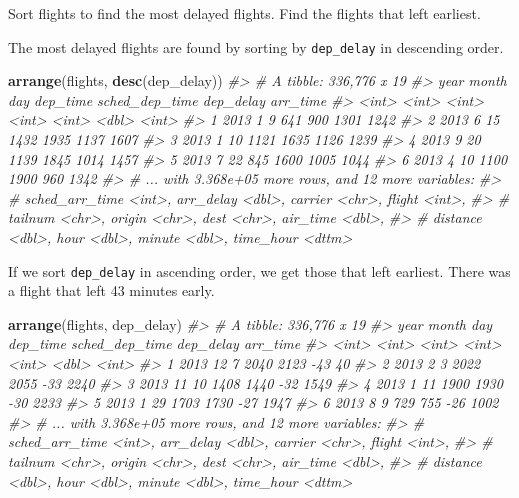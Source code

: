 \documentclass[]{book}
\newenvironment{Shaded}{\begin{snugshade}}{\end{snugshade}}
\newcommand{\CommentTok}[1]{\textcolor[rgb]{0.56,0.35,0.01}{\textit{#1}}}
\newcommand{\KeywordTok}[1]{\textcolor[rgb]{0.13,0.29,0.53}{\textbf{#1}}}
\newcommand{\NormalTok}[1]{#1}
\theoremstyle{plain}
\theoremstyle{remark}
\theoremstyle{definition}
\theoremstyle{definition}
\theoremstyle{definition}
\theoremstyle{remark}
\begin{document}
Sort flights to find the most delayed flights. Find the flights that
left earliest.

The most delayed flights are found by sorting by \texttt{dep\_delay} in
descending order.

\begin{Shaded}
\begin{Highlighting}[]
\KeywordTok{arrange}\NormalTok{(flights, }\KeywordTok{desc}\NormalTok{(dep_delay))}
\CommentTok{#> # A tibble: 336,776 x 19}
\CommentTok{#>    year month   day dep_time sched_dep_time dep_delay arr_time}
\CommentTok{#>   <int> <int> <int>    <int>          <int>     <dbl>    <int>}
\CommentTok{#> 1  2013     1     9      641            900      1301     1242}
\CommentTok{#> 2  2013     6    15     1432           1935      1137     1607}
\CommentTok{#> 3  2013     1    10     1121           1635      1126     1239}
\CommentTok{#> 4  2013     9    20     1139           1845      1014     1457}
\CommentTok{#> 5  2013     7    22      845           1600      1005     1044}
\CommentTok{#> 6  2013     4    10     1100           1900       960     1342}
\CommentTok{#> # ... with 3.368e+05 more rows, and 12 more variables:}
\CommentTok{#> #   sched_arr_time <int>, arr_delay <dbl>, carrier <chr>, flight <int>,}
\CommentTok{#> #   tailnum <chr>, origin <chr>, dest <chr>, air_time <dbl>,}
\CommentTok{#> #   distance <dbl>, hour <dbl>, minute <dbl>, time_hour <dttm>}
\end{Highlighting}
\end{Shaded}

If we sort \texttt{dep\_delay} in ascending order, we get those that
left earliest. There was a flight that left 43 minutes early.

\begin{Shaded}
\begin{Highlighting}[]
\KeywordTok{arrange}\NormalTok{(flights, dep_delay)}
\CommentTok{#> # A tibble: 336,776 x 19}
\CommentTok{#>    year month   day dep_time sched_dep_time dep_delay arr_time}
\CommentTok{#>   <int> <int> <int>    <int>          <int>     <dbl>    <int>}
\CommentTok{#> 1  2013    12     7     2040           2123       -43       40}
\CommentTok{#> 2  2013     2     3     2022           2055       -33     2240}
\CommentTok{#> 3  2013    11    10     1408           1440       -32     1549}
\CommentTok{#> 4  2013     1    11     1900           1930       -30     2233}
\CommentTok{#> 5  2013     1    29     1703           1730       -27     1947}
\CommentTok{#> 6  2013     8     9      729            755       -26     1002}
\CommentTok{#> # ... with 3.368e+05 more rows, and 12 more variables:}
\CommentTok{#> #   sched_arr_time <int>, arr_delay <dbl>, carrier <chr>, flight <int>,}
\CommentTok{#> #   tailnum <chr>, origin <chr>, dest <chr>, air_time <dbl>,}
\CommentTok{#> #   distance <dbl>, hour <dbl>, minute <dbl>, time_hour <dttm>}
\end{Highlighting}
\end{Shaded}
\end{document}
